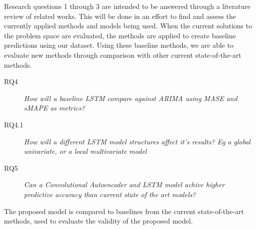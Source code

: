 Research questions 1 through 3 are intended to be answered through a literature review of related works.
This will be done in an effort to find and assess the currently applied methods and models being used.
When the current solutions to the problem space are evaluated,
the methods are applied to create baseline predictions using our dataset.
Using these baseline methods, we are able to evaluate new methods through comparison with other current state-of-the-art methods.

\begin{description}
    \item[RQ4]{\it How will a baseline LSTM compare against ARIMA using MASE and sMAPE as metrics?}
    \item[RQ4.1]{\it How will a different LSTM model structures affect it's results?
                Eg a global univariate, or a local multivariate model}

\end{description}

\begin{description}
    \item[RQ5]{\it Can a Convolutional Autoencoder and LSTM model achive higher predictive accuracy than current state of the art models?}
\end{description}


The proposed model is compared to baselines from the current state-of-the-art methods, used to evaluate the validity of the proposed model.



\iffalse

    We have aditional research questions defined in notion regarding comparison between the CNN-AE LSTM and the ARIMA model,
    but this is essentially covered trough RQ4.

    Additionaly, we have a research question focusing on anomaly prediction.
    Anomalies are going to be dificult to predict with a CNN-AE LSTM as the CNN-AE part of the model is used to reduce the noise,
    and thus make it easier to predict the overal interest development for products. (Or so we hope!)

    Regardless of this, the CNN-AE does serve as a powerfull anomaly detector, as the AE is able to predict what a "normal" value should be,
    thus giving us information regarding weither or not the values are withing this margin.

\fi
